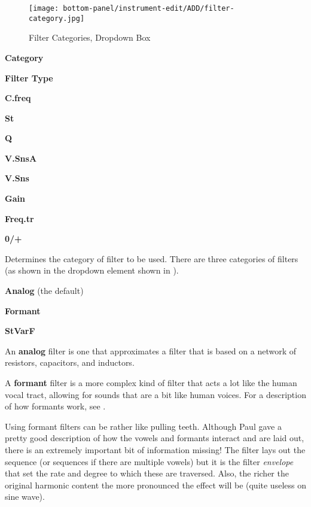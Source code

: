 \begin{figure}[H]
   \centering
   \texttt{[image: bottom-panel/instrument-edit/ADD/filter-category.jpg]}
   \caption[Filter Categories Dropdown]{Filter Categories, Dropdown Box}
   \label{fig:filter_categories_dropdown}
\end{figure}

   \begin{enumber}
      \item \textbf{Category}
      \item \textbf{Filter Type}
      \item \textbf{C.freq}
      \item \textbf{St}
      \item \textbf{Q}
      \item \textbf{V.SnsA}
      \item \textbf{V.Sns}
      \item \textbf{Gain}
      \item \textbf{Freq.tr}
      \item \textbf{0/+}
   \end{enumber}

   \setcounter{ItemCounter}{0}      %

   Determines the category of filter to be used.
   There are three categories of filters
   (as shown in the dropdown element shown in
   ).

\begin{enumber}                     %
   \item \textbf{Analog} (the default)
   \item \textbf{Formant}
   \item \textbf{StVarF}
\end{enumber}

   An \textbf{analog} filter
   is one that approximates a filter that is based on
   a network of resistors, capacitors, and inductors.

   A \textbf{formant} filter
   is a more complex kind of filter that acts a lot
   like the human vocal tract, allowing for sounds that
   are a bit like human voices.  For a description of how formants work,
   see .

   Using formant filters can be rather like pulling teeth.  Although Paul gave
   a pretty good description of how the vowels and formants interact and are
   laid out, there is an extremely important bit of information missing!  The
   filter lays out the sequence (or sequences if there are multiple vowels) but
   it is the filter \textsl{envelope} that set the rate and degree to which
   these are traversed. Also, the richer the original harmonic content the more
   pronounced the effect will be (quite useless on sine wave).

